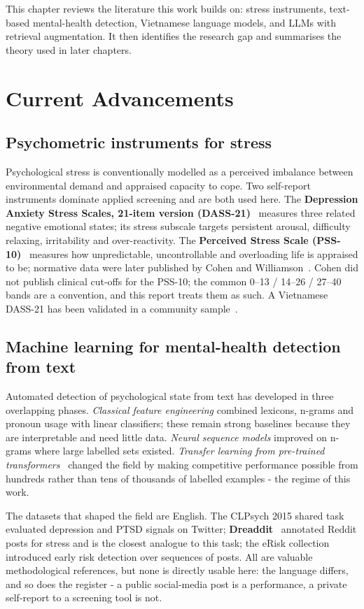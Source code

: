 This chapter reviews the literature this work builds on: stress instruments, text-based mental-health detection, Vietnamese language models, and LLMs with retrieval augmentation. It then identifies the research gap and summarises the theory used in later chapters.

\section{Current Advancements}

\subsection{Psychometric instruments for stress}
Psychological stress is conventionally modelled as a perceived imbalance between environmental demand and appraised capacity to cope. Two self-report instruments dominate applied screening and are both used here. The \textbf{Depression Anxiety Stress Scales, 21-item version (DASS-21)}~\cite{lovibond1995} measures three related negative emotional states; its stress subscale targets persistent arousal, difficulty relaxing, irritability and over-reactivity. The \textbf{Perceived Stress Scale (PSS-10)}~\cite{cohen1983} measures how unpredictable, uncontrollable and overloading life is appraised to be; normative data were later published by Cohen and Williamson~\cite{cohen1988}. Cohen did not publish clinical cut-offs for the PSS-10; the common 0--13 / 14--26 / 27--40 bands are a convention, and this report treats them as such. A Vietnamese DASS-21 has been validated in a community sample~\cite{tran2013}.

\subsection{Machine learning for mental-health detection from text}
Automated detection of psychological state from text has developed in three overlapping phases. \textit{Classical feature engineering} combined lexicons, n-grams and pronoun usage with linear classifiers; these remain strong baselines because they are interpretable and need little data. \textit{Neural sequence models} improved on n-grams where large labelled sets existed. \textit{Transfer learning from pre-trained transformers}~\cite{devlin2019} changed the field by making competitive performance possible from hundreds rather than tens of thousands of labelled examples - the regime of this work.

The datasets that shaped the field are English. The CLPsych 2015 shared task~\cite{coppersmith2015} evaluated depression and PTSD signals on Twitter; \textbf{Dreaddit}~\cite{turcan2019} annotated Reddit posts for stress and is the closest analogue to this task; the eRisk collection~\cite{losada2016} introduced early risk detection over sequences of posts. All are valuable methodological references, but none is directly usable here: the language differs, and so does the register - a public social-media post is a performance, a private self-report to a screening tool is not.

